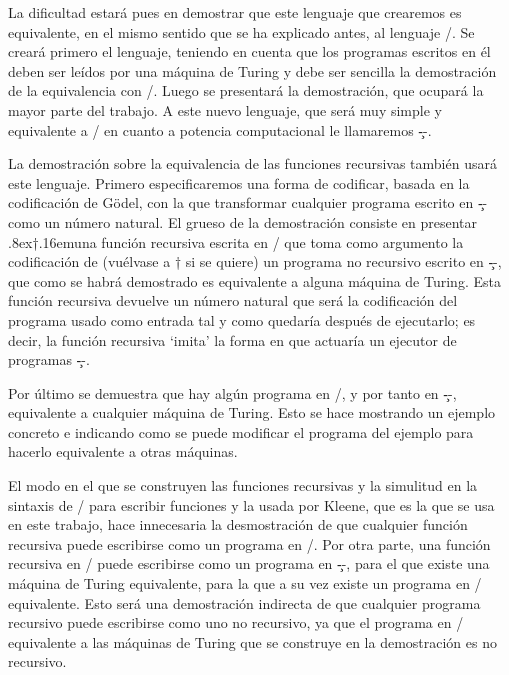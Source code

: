 La dificultad estará pues en demostrar que este lenguaje que crearemos es equivalente, en el mismo
sentido que se ha explicado antes, al lenguaje \C/. Se creará primero el lenguaje, teniendo en cuenta
que los programas escritos en él deben ser leídos por una máquina de Turing y debe ser sencilla la
demostración de la equivalencia con \C/. Luego se presentará la demostración, que ocupará la mayor
parte del trabajo. A este nuevo lenguaje, que será muy simple y equivalente a \C/ en cuanto a
potencia computacional le llamaremos \c--.

La demostración sobre la equivalencia de las funciones recursivas también usará este
lenguaje. Primero especificaremos una forma de codificar, basada en la codificación de Gödel, con la
que transformar cualquier programa escrito en \c-- como un número natural. El grueso de la
demostración consiste en presentar { \raise.8ex\hbox{†}\kern.16em}una función recursiva
escrita en \C/ que toma como argumento la codificación de (vuélvase a † si se quiere) un programa no
recursivo escrito en \c--, que como se habrá demostrado es equivalente a alguna máquina de
Turing. Esta función recursiva devuelve un número natural que será la codificación del programa
usa\-do como entrada tal y como quedaría después de ejecutarlo; es decir, la función recursiva
‘imita’ la forma en que actuaría un ejecutor de programas \c--.

Por último se demuestra que hay algún programa en \C/, y por tanto en \c--, equivalente a cualquier
máquina de Turing. Esto se hace mostrando un ejemplo concreto e indicando como se puede modificar el
programa del ejemplo para hacerlo equivalente a otras máquinas.

El modo en el que se construyen las funciones recursivas y la simulitud en la sintaxis de \C/ para
escribir funciones y la usada por Kleene, que es la que se usa en este trabajo, hace innecesaria la
desmostración de que cualquier función recursiva puede escribirse como un programa en \C/. Por otra
parte, una función recursiva en \C/ puede escribirse como un programa en \c--, para el que existe una
máquina de Turing equivalente, para la que a su vez existe un programa en \C/ equivalente. Esto será
una demostración indirecta de que cualquier programa recursivo puede escribirse como uno no
recursivo, ya que el programa en \C/ equivalente a las máquinas de Turing que se construye en la
demostración es no recursivo.

